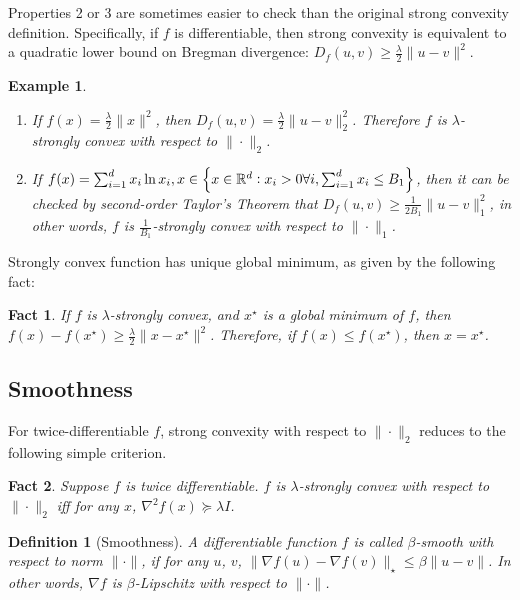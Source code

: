 \documentclass{article}
\newtheorem{example}{Example}
\newtheorem{definition}{Definition}
\newtheorem{fact}{Fact}
\newcommand{\RR}{\mathbb{R}} %
\begin{document}
Properties 2 or 3 are sometimes easier to check than the original strong convexity definition. Specifically, if $f$ is differentiable, then strong convexity is equivalent to a quadratic lower bound on Bregman divergence: $D_f(u, v) \geq \frac{\lambda}{2}\|u-v\|^2$.

\begin{example}
\begin{enumerate}
  \item If $f(x) = \frac{\lambda}{2}\|x\|^2$, then $D_f(u, v) = \frac{\lambda}{2}\|u - v\|_2^2$. Therefore $f$ is $\lambda$-strongly convex with respect to $\| \cdot \|_2$.
  \item If $f(x) = \sum_{i=1}^d x_i \ln x_i, x \in \cbr{x \in \RR^d: x_i > 0 \forall i, \sum_{i=1}^d x_i \leq B_1}$,
  then it can be checked by second-order Taylor's Theorem that $D_f(u, v) \geq \frac{1}{2B_1}\|u - v\|_1^2$, in other words, $f$ is $\frac{1}{B_1}$-strongly convex with respect to $\| \cdot \|_1$.
\end{enumerate}
\end{example}

Strongly convex function has unique global minimum, as given by the following fact:
\begin{fact}
If $f$ is $\lambda$-strongly convex, and $x^\star$ is a global minimum of $f$, then
$f(x) - f(x^\star) \geq \frac{\lambda}2 \| x - x^\star \|^2$. Therefore, if $f(x) \leq f(x^\star)$, then $x = x^\star$.
\end{fact}

\subsection{Smoothness}

For twice-differentiable $f$,
strong convexity with respect to $\| \cdot \|_2$ reduces to the following simple
criterion.
\begin{fact}
Suppose $f$ is twice differentiable.
$f$ is $\lambda$-strongly convex with respect to $\| \cdot \|_2$ iff for any $x$,
$\nabla^2 f(x) \succeq \lambda I$.
\end{fact}

\begin{definition}[Smoothness]
A differentiable function $f$ is called $\beta$-smooth with respect to norm $\|\cdot \|$, if for any $u$, $v$,
$\| \nabla f(u) - \nabla f(v) \|_\star \leq \beta \| u - v \|$.
In other words, $\nabla f$ is $\beta$-Lipschitz with respect to $\| \cdot \|$.
\end{definition}
\end{document}

